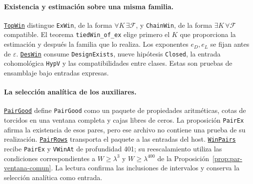\paragraph{Existencia y estimación sobre una misma familia.}
\href{https://github.com/CocoSgt/riemann-hypothesis-lean/blob/7cbf7a0c32fca1badf05931879a37c3f8a2b03b4/src/Formalism/SharpRestriction/RamificationFrobenius/TotientGaloisClasses/TopWin.lean}{\texttt{TopWin}} distingue
\texttt{ExWin}, de la forma $\forall K\,\exists\mathcal F$,
y \texttt{ChainWin}, de la forma
$\exists K\,\forall\mathcal F$ compatible.
El teorema \texttt{tiedWin\_of\_ex} elige primero el
$K$ que proporciona la estimación y después la familia que
lo realiza. Los exponentes $e_D,e_L$ se fijan antes de
$\varepsilon$. \href{https://github.com/CocoSgt/riemann-hypothesis-lean/blob/7cbf7a0c32fca1badf05931879a37c3f8a2b03b4/src/Development/AutomorphicArithmetic/CharacterBoxes/DesWin.lean}{\texttt{DesWin}}
consume \texttt{DesignExists}, nueve hipótesis
\texttt{Closed}, la entrada cohomológica \texttt{HypV}
y las compatibilidades entre clases.
Estas son pruebas de ensamblaje bajo entradas expresas.

\paragraph{La selección analítica de los auxiliares.}
\href{https://github.com/CocoSgt/riemann-hypothesis-lean/blob/7cbf7a0c32fca1badf05931879a37c3f8a2b03b4/src/Development/AutomorphicArithmetic/CharacterBoxes/PairGood.lean}{\texttt{PairGood}} define \texttt{PairGood} como
un paquete de propiedades aritméticas, cotas de torcidos en
una ventana completa y cajas libres de ceros. La proposición
\texttt{PairEx} afirma la existencia de esos pares, pero ese
archivo no contiene una prueba de su realización.
\href{https://github.com/CocoSgt/riemann-hypothesis-lean/blob/7cbf7a0c32fca1badf05931879a37c3f8a2b03b4/src/Development/AutomorphicArithmetic/CharacterBoxes/PairRows.lean}{\texttt{PairRows}} transporta el paquete a las entradas
del host. \href{https://github.com/CocoSgt/riemann-hypothesis-lean/blob/7cbf7a0c32fca1badf05931879a37c3f8a2b03b4/src/Development/AutomorphicArithmetic/CharacterBoxes/WinPairs.lean}{\texttt{WinPairs}} recibe
\texttt{PairEx} y \texttt{VWinAt} de profundidad 401;
su reescalamiento utiliza las condiciones correspondientes a
$W\ge\lambda^3$ y $W\ge\lambda^{400}$ de
la Proposición~\ref{prop:par-ventana-comun}.
La lectura confirma las inclusiones de intervalos y conserva
la selección analítica como entrada.

